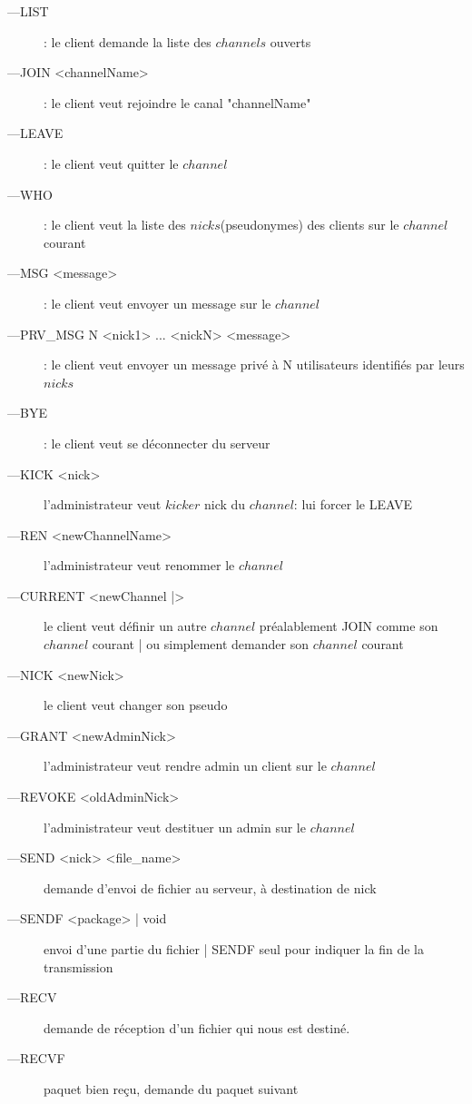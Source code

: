 \documentclass[12pt]{article}
\begin{document}
\begin{description}
    \item[---LIST]: le client demande la liste des $channels$ ouverts
    \item[---JOIN <channelName>]: le client veut rejoindre le canal "channelName" 
    \item[---LEAVE]: le client veut quitter le $channel$
    \item[---WHO] : le client veut la liste des $nicks$(pseudonymes) des clients
    sur le $channel$ courant
    \item[---MSG <message>]: le client veut envoyer un message sur le $channel$
    \item[---PRV\_MSG N <nick1> ... <nickN> <message>]: le client veut
         envoyer un message privé à N utilisateurs identifiés par leurs $nicks$
    \item[---BYE]: le client veut se déconnecter du serveur
    \item[---KICK <nick>]  l'administrateur veut $kicker$ nick
    du $channel$: lui forcer le LEAVE
    \item[---REN <newChannelName>]  l'administrateur veut renommer le $channel$
    \item[---CURRENT <newChannel |>]  le client veut définir un autre
    $channel$ préalablement JOIN comme son $channel$ courant | ou simplement
    demander son $channel$ courant
    \item[---NICK <newNick>]  le client veut changer son pseudo
    \item[---GRANT <newAdminNick>]  l'administrateur veut rendre admin
                                                un client sur le $channel$ 
    \item[---REVOKE <oldAdminNick>]  l'administrateur veut destituer 
                                            un admin sur le $channel$
    \item[---SEND <nick> <file\_name>]  demande d'envoi de fichier au serveur, à destination de nick
    \item[---SENDF <package> | void ]  envoi d'une partie du fichier | SENDF seul pour indiquer la fin de la transmission
    \item[---RECV]  demande de réception d'un fichier qui nous est destiné.
    \item[---RECVF]  paquet bien reçu, demande du paquet suivant
    \\
\end{description}
\end{document}
